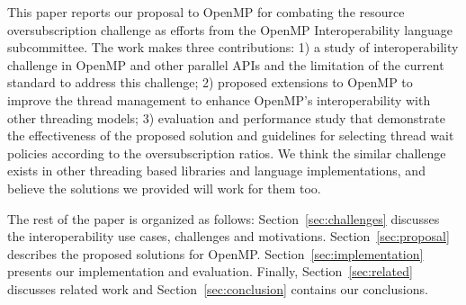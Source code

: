 
This paper reports our proposal to OpenMP for combating the resource oversubscription challenge as efforts from
the OpenMP Interoperability language subcommittee. The work makes three contributions: 1) a study 
of interoperability challenge in OpenMP and other parallel APIs and the limitation 
of the current standard to address this challenge; 2) proposed extensions to OpenMP to improve the thread
management to enhance OpenMP's interoperability with other threading models; 3) evaluation and performance
study that demonstrate the effectiveness of the proposed solution and guidelines for selecting thread
wait policies according to the oversubscription ratios. 
We think the similar challenge exists in other threading based libraries and language implementations, and believe
the solutions we provided  will work for them too.  

The rest of the paper is organized as follows: Section~\ref{sec:challenges} discusses the interoperability 
use cases, challenges and motivations. 
 Section~\ref{sec:proposal} describes the proposed solutions for OpenMP. %
 Section~\ref{sec:implementation} presents our implementation and evaluation. 
 Finally, Section~\ref{sec:related} discusses related
work and Section~\ref{sec:conclusion} contains our conclusions.






